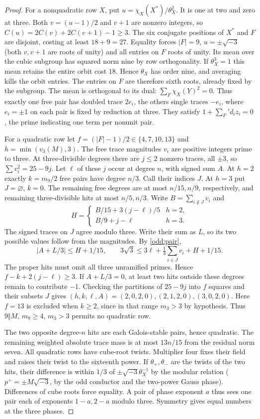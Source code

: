 \documentclass[11pt]{amsart}
\numberwithin{equation}{section}
\theoremstyle{definition}
\theoremstyle{plain}
\begin{document}
\begin{proof}
For a nonquadratic row $X$, put
$u=\chi_X(X^*)/\theta_X^2$. It is one at two and zero at three.
Both $v=(u-1)/2$ and $v+1$ are nonzero integers, so
$C(u)=2C(v)+2C(v+1)-1\ge3$. The six conjugate positions of $X^*$ and
$F$ are disjoint, costing at least $18+9=27$. Equality forces $|F|=9$,
$u=\pm\sqrt{-3}$ (both $v,v+1$ are roots of unity) and all entries on
$F$ roots of unity. Its mean over the cubic subgroup has squared norm nine
by row orthogonality. If $\theta_X^3=1$ this mean retains the entire
orbit cost $18$. Hence $\theta_X$ has order nine, and averaging kills
the orbit entries. The entries on $F$ are
therefore sixth roots, already fixed by the subgroup. The mean is
orthogonal to its dual: $\sum_F\chi_X(Y)^2=0$. Thus exactly one free
pair has doubled trace $2e_i$, the others single traces $-e_i$,
where $e_i=\pm1$ on each pair is fixed by reduction at three.
They satisfy $1+\sum_F' d_i z_i=0$, the prime indicating one term per
nonunit pair.

For a quadratic row let $f=(|F|-1)/2\in\{4,7,10,13\}$ and
$h=\min(v_3(M),3)$. The free trace magnitudes $v_i$ are positive
integers prime to three. At three-divisible degrees there are $j\le2$
nonzero traces, all $\pm3$, so $\sum v_i^2=25-9j$. Let $\ell$ of these
$j$ occur at degree $n$, with signed sum $A$. At $h=2$ exactly
$k=m_9/2$ free pairs have degree $n/3$. Call their indices $J$.
At $h=3$ put $J=\varnothing$, $k=0$. The remaining free degrees are
at most $n/15,n/9$, respectively, and remaining three-divisible hits
at most $n/5,n/3$. Write $B=\sum_{i\notin J}v_i$ and
\[
 H=\begin{cases}B/15+3(j-\ell)/5&h=2,\\
 B/9+j-\ell&h=3.\end{cases}
\]
The signed traces on $J$ agree modulo three. Write their sum as $L$,
so its two possible values follow from the magnitudes.
By \eqref{odd:pair},
\[
 |A+L/3|\le H+1/15,\qquad
 3\sqrt3\le3\ell+\tfrac13\sum_{i\in J}v_i+H+1/15.
\]
The proper hits must omit all three unramified primes. Hence
$f-k+2(j-\ell)\ge3$. If $A+L/3=0$, at least two hits outside these degrees remain
to contribute $-1$. Checking the partitions of $25-9j$ into $f$ squares
and their subsets $J$ gives $(h,k,\ell,A)=(2,0,2,0),(2,1,2,0),(3,0,2,0)$.
Here $f=13$ is excluded when $k\ge2$, since in that range $m_3>3$ by
hypothesis. Thus $9\Vert M$, $m_9\ge4$, $m_3>3$ permits no quadratic row.

The two opposite degree-$n$ hits are each Galois-stable pairs,
hence quadratic. The remaining weighted absolute trace mass is at
most $13n/15$ from the residual norm seven.
All quadratic rows have cube-root twists. Multiplier four fixes their
field and raises their twist to the sixteenth power. If $\theta_+,\theta_-$
are the twists of the two hits, their difference is within $1/3$ of
$\pm\sqrt{-3}\theta_X^{-1}$ by the modular relation
($p^+=\pm M\sqrt{-3}$, by the odd conductor and the two-power Gauss
phase). Differences of cube roots force equality. A pair of phase
exponent $a$ thus sees one pair each of exponents $1-a,2-a$ modulo
three. Symmetry gives equal numbers at the three phases.


\end{proof}
\end{document}
